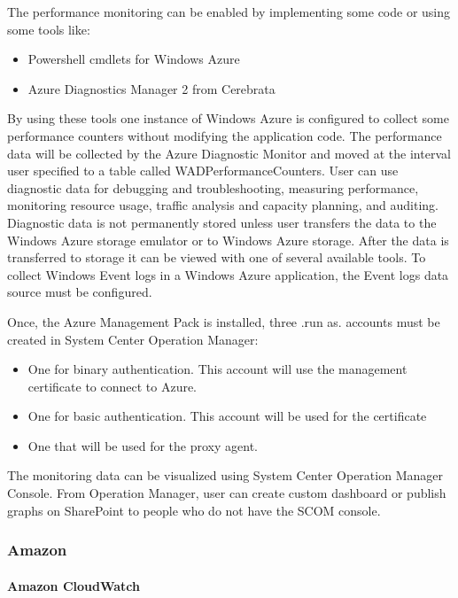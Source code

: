 \documentclass{sig-alternate-05-2015}
\begin{document}
The performance monitoring can be enabled by implementing some code or using some tools like:

\begin{itemize}
  \item Powershell cmdlets for Windows Azure~\cite{cmdlets}
  \item Azure Diagnostics Manager 2 from Cerebrata~\cite{cerebrata}
\end{itemize}

By using these tools one instance of Windows Azure is configured to collect some performance counters without modifying the application code. The performance data will be collected by the Azure Diagnostic Monitor and moved at the interval user specified to a table called WADPerformanceCounters. User can use diagnostic data for debugging and troubleshooting, measuring performance, monitoring resource usage, traffic analysis and capacity planning, and auditing. Diagnostic data is not permanently stored unless user transfers the data to the Windows Azure storage emulator or to Windows Azure storage. After the data is transferred to storage it can be viewed with one of several available tools. To collect Windows Event logs in a Windows Azure application, the Event logs data source must be configured.

Once, the Azure Management Pack is installed, three .run as. accounts must be created in System Center Operation Manager:

\begin{itemize}
 \item One for binary authentication. This account will use the management certificate to connect to Azure.
 \item One for basic authentication. This account will be used for the certificate
 \item One that will be used for the proxy agent.
\end{itemize}
 
The monitoring data can be visualized using System Center Operation Manager Console. From Operation Manager, user can create custom dashboard or publish graphs on SharePoint to people who do not have the SCOM console.

\subsubsection{Amazon}

\paragraph{Amazon CloudWatch}
\end{document}
